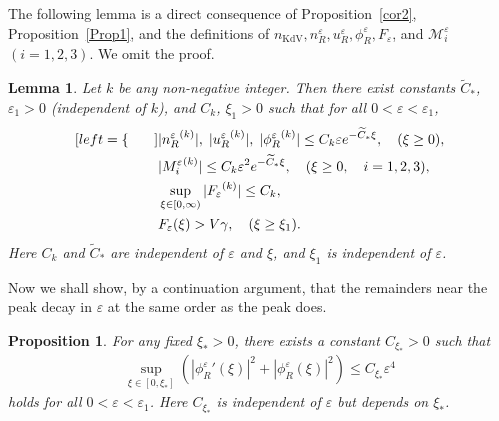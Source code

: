 \documentclass{amsart}
\newcommand{\veps}{\varepsilon}
\numberwithin{equation}{section}
\theoremstyle{plain}%
\newtheorem{lemma}[theorem]{Lemma}
\newtheorem{proposition}[theorem]{Proposition}
\theoremstyle{definition}
\theoremstyle{remark}
\theoremstyle{remark}
\begin{document}
The following lemma is a direct consequence of  Proposition~\ref{cor2}, Proposition~\ref{Prop1}, and the definitions of $n_{\text{KdV}},n_R^\veps,u_R^\veps,\phi_R^\veps,F_\veps$, and $\mathcal{M}_i^\veps$ $(i=1,2,3)$. We omit the proof.
\begin{lemma}\label{Lemma6} 
Let $k$ be any non-negative integer. Then there exist constants $\widetilde{C}_\ast$, $\veps_1>0$ (independent of $k$), and $C_k$, $\xi_1>0$ such that for all $0<\veps<\veps_1$,
\begin{subequations}
\begin{align}[left = \empheqlbrace\qquad]
& |{n_R^\veps}^{(k)}|, \; |{u_R^\veps}^{(k)}|, \; |{\phi_R^\veps}^{(k)}| \leq C_k\veps e^{-\widetilde{C}_\ast\xi}, \quad (\xi \geq 0),\label{Order nR uR phiR} \\
& |{M_i^\veps}^{(k)}| \leq C_k\veps^2 e^{-\widetilde{C}_\ast\xi}, \quad (\xi \geq 0, \quad  i=1,2,3),\label{Decay M} \\
& \sup_{\xi \in [0,\infty)}|{F_\veps}^{(k)}| \leq C_k, \label{Bd F} \\
& F_\veps(\xi)>V\gamma, \quad (\xi \geq \xi_1).  \label{LowerBd F} 
\end{align}
\end{subequations}
Here $C_k$ and $\widetilde{C}_\ast$ are independent of $\veps$ and $\xi$, and $\xi_1$ is independent of $\veps$.
\end{lemma}
Now we shall show, by a continuation argument, that the remainders near the peak decay in $\veps$ at the same order as the peak does. 
\begin{proposition}\label{Prop2}
For any fixed $\xi_\ast>0$, there exists a constant $C_{\xi_\ast}>0$ such that
\begin{equation}\label{EqProp2}
\begin{split}
\sup_{\xi\in[0,\xi_\ast]} \left( |{\phi_R^\veps}' (\xi) |^2 + | \phi_R^\veps(\xi)|^2 \right) \leq C_{\xi_\ast}\veps^4
\end{split}
\end{equation}
holds for all $0< \veps <\veps_1$. Here $C_{\xi_\ast}$ is independent of $\veps$ but depends on $\xi_\ast$.
\end{proposition}
\end{document}
